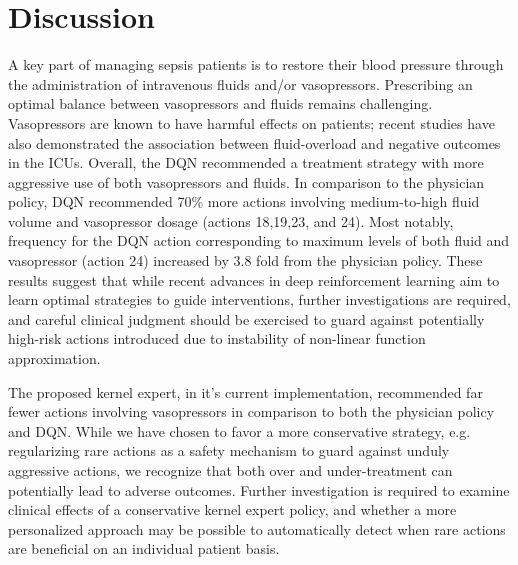 \documentclass[10pt]{amia}
\begin{document}




\section*{Discussion}

A key part of managing sepsis patients is to restore their blood pressure through the administration of intravenous fluids and/or vasopressors. Prescribing an optimal balance between vasopressors and fluids remains challenging. Vasopressors are known to have harmful effects on patients; recent studies have also demonstrated the association between fluid-overload and negative outcomes in the ICUs.\cite{kelm2015}  
Overall, the DQN recommended a treatment strategy with more aggressive use of both vasopressors and fluids.   In comparison to the physician policy, DQN recommended  70\% more actions involving medium-to-high fluid volume and vasopressor dosage (actions 18,19,23, and 24). Most notably, frequency for the DQN action corresponding to maximum levels of both fluid and vasopressor (action 24) increased by 3.8 fold from the physician policy.  These results suggest that while recent advances in deep reinforcement learning aim to learn optimal strategies to guide interventions, further investigations are required, and careful clinical judgment should be exercised to guard against potentially high-risk actions introduced due to instability of non-linear function approximation.   

The proposed kernel expert, in it's current implementation,  recommended far fewer actions involving vasopressors in comparison to both the physician policy and DQN.  While we have chosen to favor a more conservative strategy, e.g. regularizing rare actions as a safety mechanism to guard against unduly aggressive actions,  we recognize that both over and under-treatment can potentially lead to adverse outcomes. Further investigation is required to examine  clinical effects of a conservative kernel expert policy, and whether a more personalized approach may be possible to automatically detect when rare actions are beneficial on an individual patient basis. 
\end{document}
